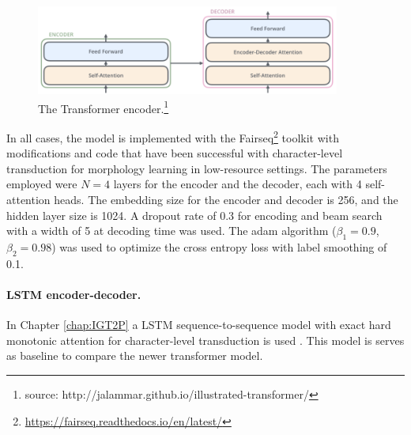 \begin{figure}[t]
    \centering
    \includegraphics[width=10cm]{figs/Transformer_simplified.png}
    \caption[Transformer]{The Transformer encoder.\footnote{source: http://jalammar.github.io/illustrated-transformer/}}
    \label{fig:transformer}
\end{figure}

In all cases, the model is implemented with the Fairseq\footnote{\url{https://fairseq.readthedocs.io/en/latest/}} toolkit \citep{ott2019fairseq} with modifications and code \citep{wu_applying_2020} that have been successful with character-level transduction for morphology learning in low-resource settings. The parameters employed were $N=4$ layers for the encoder and the decoder, each with 4 self-attention heads. The embedding size for the encoder and decoder is 256, and the hidden layer size is 1024. A dropout rate of 0.3 for encoding and beam search with a width of 5 at decoding time was used. The adam algorithm \citep{kingma2014adam} ($\beta_1 = 0.9$, $\beta_2 = 0.98$) was used to optimize the cross entropy loss with label smoothing \citep{szegedy2016rethinking} of 0.1. 



\paragraph{LSTM encoder-decoder.} In Chapter \ref{chap:IGT2P} a LSTM sequence-to-sequence model with exact hard monotonic attention for character-level transduction is used \citep{wu-cotterell-2019-exact}. This model is serves as baseline to compare the newer transformer model. 
